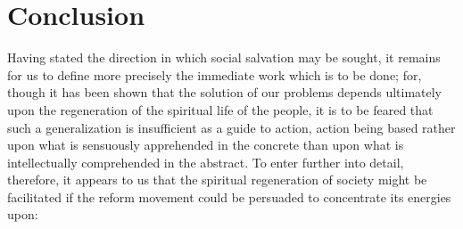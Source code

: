 \documentclass{book}
\begin{document}
\chapter{Conclusion}
\label{chapter-6}
Having stated the direction in which social salvation may be sought, it remains for us to define more precisely the immediate work which is to be done; for, though it has been shown that the solution of our problems depends ultimately upon the regeneration of the spiritual life of the people, it is to be feared that such a generalization is insufficient as a guide to action, action being based rather upon what is sensuously apprehended in the concrete than upon what is intellectually comprehended in the abstract. To enter further into detail, therefore, it appears to us that the spiritual regeneration of society might be facilitated if the reform movement could be persuaded to concentrate its energies upon:
\end{document}
